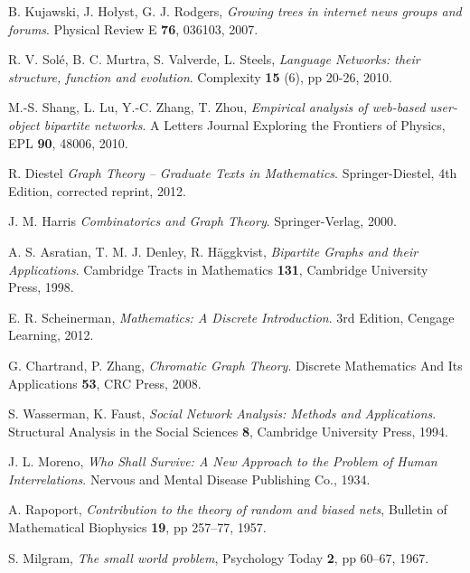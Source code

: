 \cleardoublepage
{}
{}
\begin{thebibliography}{99}

  B. Kujawski, J. Hołyst, G. J. Rodgers,
  \emph{Growing trees in internet news groups and forums}.
  Physical Review E \textbf{76}, 036103,
  2007.

  R. V. Solé, B. C. Murtra, S. Valverde, L. Steels,
  \emph{Language Networks: their structure, function and evolution}.
  Complexity \textbf{15} (6), pp 20-26,
  2010.

  M.-S. Shang, L. Lu, Y.-C. Zhang, T. Zhou,
  \emph{Empirical analysis of web-based user-object bipartite networks}.
  A Letters Journal Exploring the Frontiers of Physics, EPL \textbf{90}, 48006,
  2010.

  R. Diestel
  \emph{Graph Theory -- Graduate Texts in Mathematics}.
  Springer-Diestel,
  4th Edition, corrected reprint,
  2012.

  J. M. Harris
  \emph{Combinatorics and Graph Theory}.
  Springer-Verlag,
  2000.

  A. S. Asratian, T. M. J. Denley, R. Häggkvist,
  \emph{Bipartite Graphs and their Applications}.
  Cambridge Tracts in Mathematics \textbf{131},
  Cambridge University Press,
  1998.

  E. R. Scheinerman, 
  \emph{Mathematics: A Discrete Introduction}.
  3rd Edition,
  Cengage Learning,
  2012.

  G. Chartrand, P. Zhang,
  \emph{Chromatic Graph Theory}.
  Discrete Mathematics And Its Applications \textbf{53},
  CRC Press,
  2008.

  S. Wasserman, K. Faust,
  \emph{Social Network Analysis: Methods and Applications}.
  Structural Analysis in the Social Sciences \textbf{8},
  Cambridge University Press,
  1994.

  J. L. Moreno,
  \emph{Who Shall Survive: A New Approach to the Problem of Human Interrelations}.
  Nervous and Mental Disease Publishing Co.,
  1934.

  A. Rapoport, 
  \emph{Contribution to the theory of random and biased nets},
  Bulletin of Mathematical Biophysics \textbf{19}, pp 257–77,
  1957.

  S. Milgram,
  \emph{The small world problem},
  Psychology Today \textbf{2}, pp 60–67,
  1967.


\end{thebibliography}
